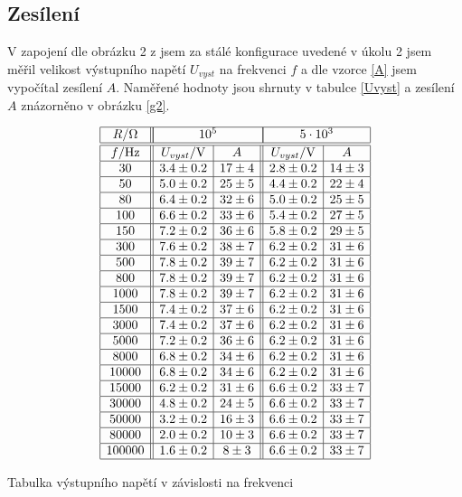 \documentclass[a4paper,12pt]{article}
\begin{document}
\subsection{Zesílení}
V zapojení dle obrázku 2 z \cite{text} jsem za stálé konfigurace uvedené v úkolu 2 jsem měřil velikost výstupního napětí 
$U_{vyst}$ na frekvenci $f$ a dle vzorce \ref{A} jsem vypočítal zesílení $A$.
Naměřené hodnoty jsou shrnuty v tabulce \ref{Uvyst} a zesílení $A$ znázorněno v obrázku \ref{g2}.

\begin{table}
$$
\begin{array}{|c||c|c||c|c|}
\hline
R/\Omega &  \multicolumn{2}{|c|}{10^5} & \multicolumn{2}{|c|}{ 5 \cdot 10^3} \\
\hline \hline
f/\mbox{Hz} & U_{vyst}/\mbox{V} &   A   &  U_{vyst}/\mbox{V}    &   A   \\ \hline
30      &    3.4\pm 0.2 &17\pm4     &    2.8\pm 0.2   &14\pm3     \\ \hline
50      &    5.0\pm 0.2 &25\pm5     &    4.4\pm 0.2   &22\pm4     \\ \hline
80      &    6.4\pm 0.2 &32\pm6     &    5.0\pm 0.2   &25\pm5     \\ \hline
100     &    6.6\pm 0.2 &33\pm6     &    5.4\pm 0.2   &27\pm5     \\ \hline
150     &    7.2\pm 0.2 &36\pm6     &    5.8\pm 0.2   &29\pm5     \\ \hline
300     &    7.6\pm 0.2 &38\pm7     &    6.2\pm 0.2   &31\pm6     \\ \hline
500     &    7.8\pm 0.2 &39\pm7     &    6.2\pm 0.2   &31\pm6     \\ \hline
800     &    7.8\pm 0.2 &39\pm7     &    6.2\pm 0.2   &31\pm6     \\ \hline
1000    &    7.8\pm 0.2 &39\pm7     &    6.2\pm 0.2   &31\pm6     \\ \hline
1500    &    7.4\pm 0.2 &37\pm6     &    6.2\pm 0.2   &31\pm6     \\ \hline
3000    &    7.4\pm 0.2 &37\pm6     &    6.2\pm 0.2   &31\pm6     \\ \hline
5000    &    7.2\pm 0.2 &36\pm6     &    6.2\pm 0.2   &31\pm6     \\ \hline
8000    &    6.8\pm 0.2 &34\pm6     &    6.2\pm 0.2   &31\pm6     \\ \hline
10000   &    6.8\pm 0.2 &34\pm6     &    6.2\pm 0.2   &31\pm6     \\ \hline
15000   &    6.2\pm 0.2 &31\pm6     &    6.6\pm 0.2   &33 \pm7    \\ \hline
30000   &    4.8\pm 0.2 &24\pm5     &    6.6\pm 0.2   &33\pm7     \\ \hline
50000   &    3.2\pm 0.2 &16\pm3     &    6.6\pm 0.2   &33\pm7     \\ \hline
80000   &    2.0\pm 0.2 &10\pm3     &    6.6\pm 0.2   &33\pm7     \\ \hline
100000  &    1.6\pm 0.2 &8\pm3     &    6.6\pm 0.2   &33\pm7     \\ \hline
\end{array}
$$
\caption{Tabulka výstupního napětí v závislosti na frekvenci}
\label{Uvyst}
\end{table}
\end{document}
